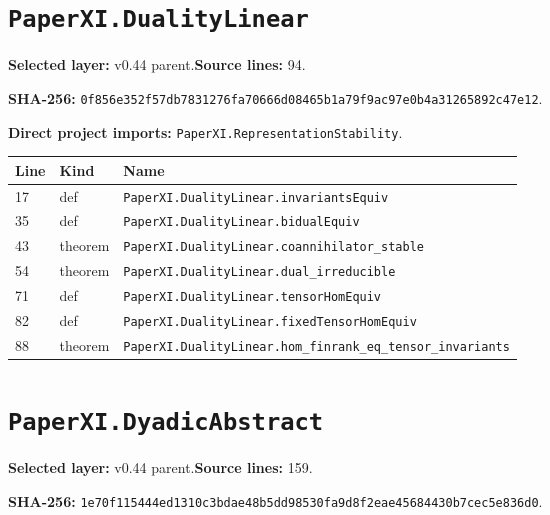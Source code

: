 \documentclass[10pt,oneside]{book}
\begin{document}
\section{\texorpdfstring{\nolinkurl{PaperXI.DualityLinear}}{PaperXI.DualityLinear}}\label{module:PaperXI.DualityLinear}

\textbf{Selected layer:} v0.44 parent.\quad\textbf{Source lines:} 94.\par\textbf{SHA-256:} {\scriptsize\nolinkurl{0f856e352f57db7831276fa70666d08465b1a79f9ac97e0b4a31265892c47e12}}.


\textbf{Direct project imports:} \nolinkurl{PaperXI.RepresentationStability}.

\begin{longtable}{@{}p{}p{}p{}@{}}\toprule Line&Kind&Name\\\midrule\endhead

17&def&\nolinkurl{PaperXI.DualityLinear.invariantsEquiv}\\

35&def&\nolinkurl{PaperXI.DualityLinear.bidualEquiv}\\

43&theorem&\nolinkurl{PaperXI.DualityLinear.coannihilator_stable}\\

54&theorem&\nolinkurl{PaperXI.DualityLinear.dual_irreducible}\\

71&def&\nolinkurl{PaperXI.DualityLinear.tensorHomEquiv}\\

82&def&\nolinkurl{PaperXI.DualityLinear.fixedTensorHomEquiv}\\

88&theorem&\nolinkurl{PaperXI.DualityLinear.hom_finrank_eq_tensor_invariants}\\

\bottomrule\end{longtable}

\section{\texorpdfstring{\nolinkurl{PaperXI.DyadicAbstract}}{PaperXI.DyadicAbstract}}\label{module:PaperXI.DyadicAbstract}

\textbf{Selected layer:} v0.44 parent.\quad\textbf{Source lines:} 159.\par\textbf{SHA-256:} {\scriptsize\nolinkurl{1e70f115444ed1310c3bdae48b5dd98530fa9d8f2eae45684430b7cec5e836d0}}.
\end{document}
